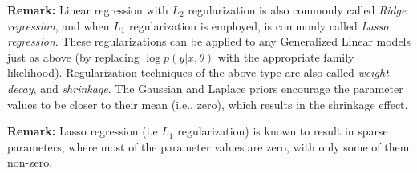 \begin{enumerate}
    
    
    
       
\end{enumerate}

\textbf{Remark:} Linear regression with $L_2$ regularization is also commonly called \emph{Ridge regression}, and when $L_1$ regularization is employed, is commonly called \emph{Lasso regression}. These regularizations can be applied to any Generalized Linear models just as above (by replacing $\log p(y|x,\theta)$ with the appropriate family likelihood). Regularization techniques of the above type are also called \emph{weight decay}, and \emph{shrinkage}. The Gaussian and Laplace priors encourage the parameter values to be closer to their mean (i.e., zero), which results in the shrinkage effect.

\textbf{Remark:} Lasso regression (i.e $L_1$ regularization) is known to result in sparse parameters, where most of the parameter values are zero, with only some of them non-zero.
